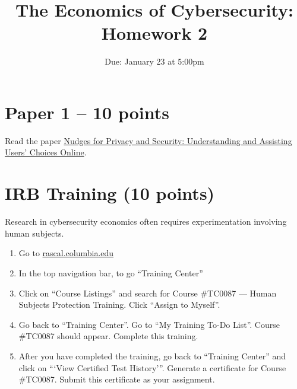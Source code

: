 \documentclass[11pt]{article}
\title{The Economics of Cybersecurity: Homework 2}
\date{Due: January 23 at 5:00pm}
\author{}
\begin{document}
\maketitle


\section{Paper 1 -- 10 points}

Read the paper \href{https://dl.acm.org/doi/abs/10.1145/3054926}{Nudges for Privacy and Security: Understanding and Assisting Users’ Choices Online}. 


\section{IRB Training (10 points)}

Research in cybersecurity economics often requires experimentation involving human subjects. 

\begin{enumerate}
    \item Go to \href{rascal.columbia.edu}{rascal.columbia.edu}
    \item In the top navigation bar, to go ``Training Center''
    \item Click on ``Course Listings'' and search for Course \#TC0087 --- Human Subjects Protection Training. Click ``Assign to Myself''.
    \item Go back to ``Training Center''. Go to ``My Training To-Do List''. Course \#TC0087 should appear. Complete this training.
    \item After you have completed the training, go back to ``Training Center'' and click on ```View Certified Test History'''. Generate a certificate for Course \#TC0087. Submit this certificate as your assignment.
\end{enumerate}
\end{document}
